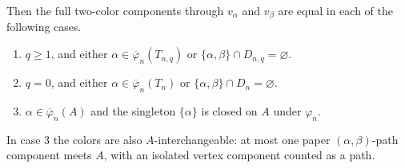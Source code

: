 \begin{lemma}
Then the full two-color components through $v_\alpha$ and $v_\beta$
are equal in each of the following cases.
\begin{enumerate}
\item $q\geq1$, and either
$\alpha\in\overline\varphi_n(T_{n,q})$ or
$\{\alpha,\beta\}\cap D_{n,q}=\varnothing$.
\item $q=0$, and either
$\alpha\in\overline\varphi_n(T_n)$ or
$\{\alpha,\beta\}\cap D_n=\varnothing$.
\item $\alpha\in\overline\varphi_n(A)$ and the singleton
$\{\alpha\}$ is closed on $A$ under $\varphi_n$.
\end{enumerate}
In case 3 the colors are also $A$-interchangeable: at most one paper
$(\alpha,\beta)$-path component meets $A$, with an isolated vertex
component counted as a path.
\end{lemma}
